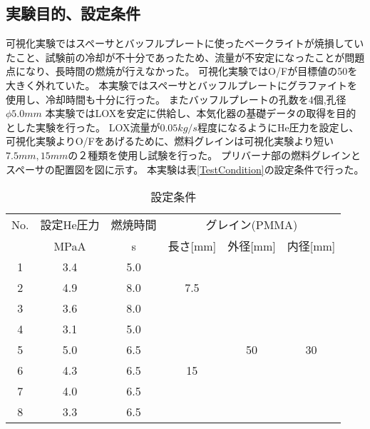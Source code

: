 \subsection{実験目的、設定条件}
可視化実験ではスペーサとバッフルプレートに使ったベークライトが焼損していたこと、試験前の冷却が不十分であったため、流量が不安定になったことが問題点になり、長時間の燃焼が行えなかった。
可視化実験ではO/Fが目標値の50を大きく外れていた。
本実験ではスペーサとバッフルプレートにグラファイトを使用し、冷却時間も十分に行った。
またバッフルプレートの孔数を4個,孔径$\phi5.0mm$
本実験ではLOXを安定に供給し、本気化器の基礎データの取得を目的とした実験を行った。
LOX流量が$0.05kg/s$程度になるようにHe圧力を設定し、可視化実験よりO/Fをあげるために、燃料グレインは可視化実験より短い$7.5mm,15mm$の２種類を使用し試験を行った。
プリバーナ部の燃料グレインとスペーサの配置図を図に示す。
本実験は表\ref{TestCondition}の設定条件で行った。
\begin{table}[htb]
\begin{center}
\caption{設定条件}
\small
\begin{tabular}{|c|c|c|c|c|c|} \hline
No. & 設定He圧力 & 燃焼時間 & \multicolumn{3}{|c|}{グレイン(PMMA)} \\ \cline{2-6}
 & MPaA & s & 長さ[mm] & 外径[mm] & 内径[mm]  \\ \hline
1 & 3.4 & 5.0 & & & \\ \cline{1-3}
2 & 4.9 & 8.0 &7.5 & & \\ \cline{1-3}
3 & 3.6 & 8.0 & & & \\ \cline{1-4}
4 & 3.1 & 5.0 & & & \\ \cline{1-4}
5 & 5.0 & 6.5 & & 50 & 30 \\ \cline{1-4}
6 & 4.3 & 6.5 & 15 & &  \\ \cline{1-4}
7 & 4.0 & 6.5 & & &  \\ \cline{1-4}
8 & 3.3 & 6.5 & & &  \\ \hline
\end{tabular}
\label{tab:TestCondition}
\end{center}
\end{table}
